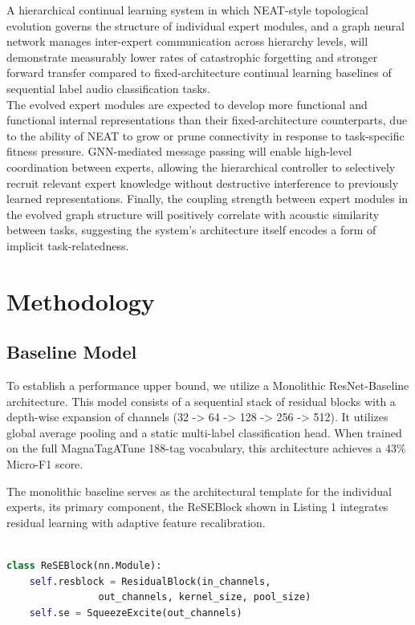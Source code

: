 \documentclass{article}
\begin{document}
A hierarchical continual learning system in which NEAT-style topological evolution governs the structure of individual expert modules, and a graph neural network manages inter-expert communication across hierarchy levels, will demonstrate measurably lower rates of catastrophic forgetting and stronger forward transfer compared to fixed-architecture continual learning baselines of sequential label audio classification tasks.\\

\noindent The evolved expert modules are expected to develop more functional and functional internal representations than their fixed-architecture counterparts, due to the ability of NEAT to grow or prune connectivity in response to task-specific fitness pressure. GNN-mediated message passing will enable high-level coordination between experts, allowing the hierarchical controller to selectively recruit relevant expert knowledge without destructive interference to previously learned representations. Finally, the coupling strength between expert modules in the evolved graph structure will positively correlate with acoustic similarity between tasks, suggesting the system’s architecture itself encodes a form of implicit task-relatedness.

\section{Methodology}

\subsection{Baseline Model}
To establish a performance upper bound, we utilize a Monolithic ResNet-Baseline architecture. This model consists of a sequential stack of residual blocks with a depth-wise expansion of channels (32 -> 64 -> 128 -> 256 -> 512). It utilizes global average pooling and a static multi-label classification head. When trained on the full MagnaTagATune 188-tag vocabulary, this architecture achieves a 43\% Micro-F1 score.

The monolithic baseline serves as the architectural template for the individual experts, its primary component, the ReSEBlock shown in Listing 1 integrates residual learning with adaptive feature recalibration.

\begin{lstlisting}[language=Python,  caption= ReSEBlock]

class ReSEBlock(nn.Module):
	self.resblock = ResidualBlock(in_channels, 
                out_channels, kernel_size, pool_size)
	self.se = SqueezeExcite(out_channels)
\end{lstlisting}
\end{document}
